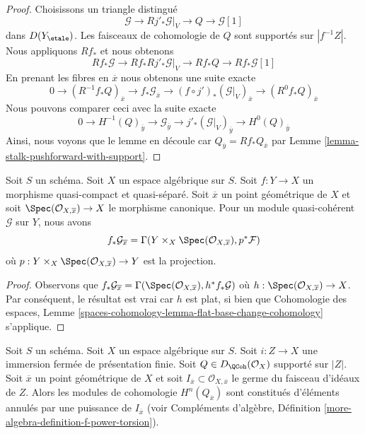 \begin{proof}
Choisissons un triangle distingué
$$
\mathcal{G} \to Rj'_*\mathcal{G}|_V \to Q \to \mathcal{G}[1]
$$
dans $D(Y_\etale)$. Les faisceaux de cohomologie de $Q$
sont supportés sur $|f^{-1}Z|$. Nous appliquons $Rf_*$ et nous obtenons
$$
Rf_*\mathcal{G} \to Rf_*Rj'_*\mathcal{G}|_V \to Rf_*Q
\to Rf_*\mathcal{G}[1]
$$
En prenant les fibres en $\overline{x}$ nous obtenons une suite exacte
$$
0 \to
(R^{-1}f_*Q)_{\overline{x}} \to
f_*\mathcal{G}_{\overline{x}} \to
(f \circ j')_*(\mathcal{G}|_V)_{\overline{x}} \to
(R^0f_*Q)_{\overline{x}}
$$
Nous pouvons comparer ceci avec la suite exacte
$$
0 \to
H^{-1}(Q)_{\overline{y}} \to
\mathcal{G}_{\overline{y}} \to
j'_*(\mathcal{G}|_V)_{\overline{y}} \to
H^0(Q)_{\overline{y}}
$$
Ainsi, nous voyons que le lemme en découle car
$Q_{\overline{y}} = Rf_*Q_{\overline{x}}$ par
Lemme \ref{lemma-stalk-pushforward-with-support}.
\end{proof}

\begin{lemma}
\label{lemma-stalk-of-pushforward}
Soit $S$ un schéma. Soit $X$ un espace algébrique sur $S$.
Soit $f : Y \to X$ un morphisme quasi-compact et quasi-séparé.
Soit $\overline{x}$ un point géométrique de $X$ et soit
$\Spec(\mathcal{O}_{X, \overline{x}}) \to X$
le morphisme canonique. Pour un module quasi-cohérent
$\mathcal{G}$ sur $Y$, nous avons
$$
f_*\mathcal{G}_{\overline{x}} =
\Gamma(Y \times_X \Spec(\mathcal{O}_{X, \overline{x}}), p^*\mathcal{F})
$$
où $p : Y \times_X \Spec(\mathcal{O}_{X, \overline{x}}) \to Y$
est la projection.
\end{lemma}

\begin{proof}
Observons que $f_*\mathcal{G}_{\overline{x}} =
\Gamma(\Spec(\mathcal{O}_{X, \overline{x}}), h^*f_*\mathcal{G})$
où $h : \Spec(\mathcal{O}_{X, \overline{x}}) \to X$.
Par conséquent, le résultat est vrai car $h$ est plat, si bien que
Cohomologie des espaces, Lemme
\ref{spaces-cohomology-lemma-flat-base-change-cohomology}
s'applique.
\end{proof}

\begin{lemma}
\label{lemma-stalk-of-module-with-support}
Soit $S$ un schéma. Soit $X$ un espace algébrique sur $S$.
Soit $i : Z \to X$ une immersion fermée de présentation finie.
Soit $Q \in D_\QCoh(\mathcal{O}_X)$ supporté sur $|Z|$.
Soit $\overline{x}$ un point géométrique de $X$ et soit
$I_{\overline{x}} \subset \mathcal{O}_{X, \overline{x}}$ le germe du
faisceau d'idéaux de $Z$. Alors les modules de cohomologie
$H^n(Q_{\overline{x}})$ sont constitués d'éléments annulés par une puissance de $I_{\overline{x}}$
(voir Compléments d'algèbre, Définition
\ref{more-algebra-definition-f-power-torsion}).
\end{lemma}

